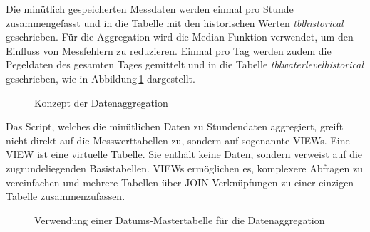
\newpage
Die minütlich gespeicherten Messdaten werden einmal pro Stunde zusammengefasst und in die Tabelle mit den historischen Werten \emph{tblhistorical} geschrieben. Für die Aggregation wird die Median-Funktion verwendet, um den Einfluss von Messfehlern zu reduzieren. Einmal pro Tag werden zudem die Pegeldaten des gesamten Tages gemittelt und in die Tabelle \emph{tblwaterlevelhistorical} geschrieben, wie in Abbildung\,\ref{img:historical} dargestellt.

\begin{figure}[htbp!]
	\centering
	\caption{Konzept der Datenaggregation}
	\label{img:historical}
\end{figure}


\noindent
Das Script, welches die minütlichen Daten zu Stundendaten aggregiert, greift nicht direkt auf die Messwerttabellen zu, sondern auf sogenannte VIEWs. Eine VIEW ist eine virtuelle Tabelle. Sie enthält keine Daten, sondern verweist auf die zugrundeliegenden Basistabellen. VIEWs ermöglichen es, komplexere Abfragen zu vereinfachen und mehrere Tabellen über JOIN-Verknüpfungen zu einer einzigen Tabelle zusammenzufassen.

\begin{figure}[htbp!]
	\centering
	\caption{Verwendung einer Datums-Mastertabelle für die Datenaggregation}
	\label{img:leftjoin}
\end{figure}


